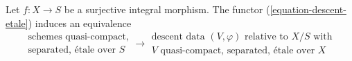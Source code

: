 %

\begin{proposition}
\label{proposition-effective}
Let $f : X \to S$ be a surjective integral morphism.
The functor (\ref{equation-descent-etale}) induces an equivalence
$$
\begin{matrix}
\text{schemes quasi-compact,}\\
\text{separated, \'etale over }S
\end{matrix}
\longrightarrow
\begin{matrix}
\text{descent data }(V, \varphi)\text{ relative to }X/S\text{ with}\\
V\text{ quasi-compact, separated, \'etale over }X
\end{matrix}
$$
\end{proposition}

